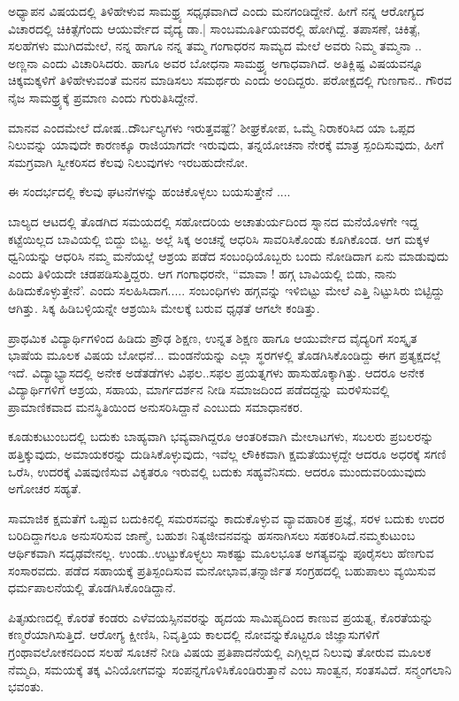 {ಅಧ್ಯಾಪನ ವಿಷಯದಲ್ಲಿ ತಿಳಿಹೇಳುವ ಸಾಮಥ್ರ್ಯ ಸಧೃಢವಾಗಿದೆ ಎಂದು ಮನಗಂಡಿದ್ದೇನೆ.  ಹೀಗೆ ನನ್ನ ಆರೋಗ್ಯದ ವಿಚಾರದಲ್ಲಿ ಚಿಕಿತ್ಸೆಗೆಂದು ಆಯುರ್ವೇದ ವೈದ್ಯ ಡಾ.| ಸಾಂಬಮೂರ್ತಿಯವರಲ್ಲಿ ಹೋಗಿದ್ದೆ. ತಪಾಸಣೆ, ಚಿಕಿತ್ಸೆ, ಸಲಹೆಗಳು ಮುಗಿದಮೇಲೆ, ನನ್ನ ಹಾಗೂ  ನನ್ನ ತಮ್ಮ ಗಂಗಾಧರನ ಸಾಮ್ಯದ ಮೇಲೆ ಅವರು ನಿಮ್ಮ ತಮ್ಮನಾ .. ಅಣ್ಣನಾ ಎಂದು ವಿಚಾರಿಸಿದರು. ಹಾಗೂ ಅವರ ಬೋಧನಾ ಸಾಮಥ್ರ್ಯ ಅಗಾಧವಾಗಿದೆ. ಅತಿಕ್ಲಿಷ್ಟ ವಿಷಯವನ್ನೂ ಚಿಕ್ಕಮಕ್ಕಳಿಗೆ ತಿಳಿಹೇಳುವಂತೆ ಮನನ ಮಾಡಿಸಲು ಸಮರ್ಥರು ಎಂದು ಅಂದಿದ್ದರು. ಪರೋಕ್ಷದಲ್ಲಿ ಗುಣಗಾನ.. ಗೌರವ ನೈಜ ಸಾಮಥ್ರ್ಯಕ್ಕೆ  ಪ್ರಮಾಣ ಎಂದು ಗುರುತಿಸಿದ್ದೇನೆ.

ಮಾನವ ಎಂದಮೇಲೆ ದೋಷ..ದೌರ್ಬಲ್ಯಗಳು ಇರುತ್ತವಷ್ಟೆ?  ಶೀಘ್ರಕೋಪ,  ಒಮ್ಮೆ ನಿರಾಕರಿಸಿದ ಯಾ ಒಪ್ಪದ ನಿಲುವನ್ನು ಯಾವುದೇ ಕಾರಣಕ್ಕೂ ರಾಜಿಯಾಗದೇ ಇರುವುದು,  ತನ್ನಯೋಚನಾ ನೇರಕ್ಕೆ ಮಾತ್ರ ಸ್ಪಂದಿಸುವುದು,  ಹೀಗೆ  ಸಮಗ್ರವಾಗಿ ಸ್ವೀಕರಿ\-ಸದ  ಕೆಲವು ನಿಲುವುಗಳು ಇರಬಹುದೇನೋ.

ಈ ಸಂದರ್ಭದಲ್ಲಿ ಕೆಲವು  ಘಟನೆಗಳನ್ನು  ಹಂಚಿಕೊಳ್ಳಲು ಬಯಸುತ್ತೇನೆ ....
\vskip 2pt

ಬಾಲ್ಯದ ಆಟದಲ್ಲಿ ತೊಡಗಿದ ಸಮಯದಲ್ಲಿ ಸಹೋದರಿಯ ಅಚಾತುರ್ಯದಿಂದ ಸ್ನಾನದ ಮನೆಯೊಳಗೇ ಇದ್ದ ಕಟ್ಟೆಯಿಲ್ಲದ ಬಾವಿಯಲ್ಲಿ ಬಿದ್ದು ಬಿಟ್ಟ. ಅಲ್ಲೆ ಸಿಕ್ಕ ಅಂಚನ್ನೆ ಆಧರಿಸಿ ಸಾವರಿಸಿಕೊಂಡು  ಕೂಗಿಕೊಂಡ. ಆಗ ಮಕ್ಕಳ ಧ್ವನಿಯನ್ನು ಆಧರಿಸಿ ನಮ್ಮ ಮನೆಯಲ್ಲೆ ಆಶ್ರಯ ಪಡೆದ ಸಂಬಂಧಿಯೊಬ್ಬರು ಬಂದು ನೋಡಿದಾಗ ಏನು ಮಾಡುವುದು ಎಂದು ತಿಳಿಯದೇ ಚಡಪಡಿಸುತ್ತಿದ್ದರು. ಆಗ ಗಂಗಾಧರನೇ, “ಮಾವಾ ! ಹಗ್ಗ ಬಾವಿಯಲ್ಲಿ ಬಿಡು, ನಾನು ಹಿಡಿದುಕೊಳ್ಳುತ್ತೇನೆ'. ಎಂದು ಸಲಹಿಸಿದಾಗ..... ಸಂಬಂಧಿಗಳು ಹಗ್ಗವನ್ನು ಇಳಿಬಿಟ್ಟು ಮೇಲೆ ಎತ್ತಿ ನಿಟ್ಟುಸಿರು ಬಿಟ್ಟಿದ್ದು ಆಗಿತ್ತು. ಸಿಕ್ಕ ಹಿಡಿಬಳ್ಳಿಯನ್ನೇ  ಆಶ್ರಯಿಸಿ ಮೇಲಕ್ಕೆ ಬರುವ ಧೃಢತೆ ಆಗಲೇ ಕಂಡಿತ್ತು.
\vskip 2pt

ಪ್ರಾಥಮಿಕ ವಿದ್ಯಾರ್ಥಿಗಳಿಂದ ಹಿಡಿದು ಪ್ರೌಢ ಶಿಕ್ಷಣ, ಉನ್ನತ ಶಿಕ್ಷಣ ಹಾಗೂ ಆಯುರ್ವೇದ ವೈದ್ಯರಿಗೆ ಸಂಸ್ಕೃತ ಭಾಷೆಯ ಮೂಲಕ ವಿಷಯ ಬೋಧನೆ... ಮಂಡನೆ\-ಯನ್ನು ಎಲ್ಲಾ ಸ್ಥರಗಳಲ್ಲಿ ತೊಡಗಿಸಿಕೊಂಡಿದ್ದು ಈಗ ಪ್ರತ್ಯಕ್ಷದಲ್ಲೆ ಇದೆ. ವಿದ್ಯಾಭ್ಯಾಸದಲ್ಲಿ ಅನೇಕ ಅಡೆತಡೆಗಳು ವಿಫಲ..ಸಫಲ ಪ್ರಯತ್ನಗಳು ಹಾಸುಹೊಕ್ಕಾಗಿತ್ತು. ಆದರೂ ಅನೇಕ ವಿದ್ಯಾರ್ಥಿಗಳಿಗೆ  ಆಶ್ರಯ, ಸಹಾಯ,  ಮಾರ್ಗದರ್ಶನ ನೀಡಿ ಸಮಾಜದಿಂದ ಪಡೆದದ್ದನ್ನು ಮರಳಿಸುವಲ್ಲಿ ಪ್ರಾಮಾಣಿಕವಾದ ಮನಸ್ಥಿತಿಯಿಂದ ಅನುಸರಿಸಿದ್ದಾನೆ ಎಂಬುದು  ಸಮಾಧಾನಕರ.
\vskip 2pt

ಕೂಡುಕುಟುಂಬದಲ್ಲಿ ಬದುಕು ಬಾಹ್ಯವಾಗಿ ಭವ್ಯವಾಗಿದ್ದರೂ ಆಂತರಿಕವಾಗಿ ಮೇಲಾಟಗಳು, ಸಬಲರು ಪ್ರಬಲರನ್ನು ಹತ್ತಿಕ್ಕುವುದು, ಅಮಾಯಕರನ್ನು ದುಡಿಸಿ\-ಕೊಳ್ಳುವುದು, ಇವೆಲ್ಲ ಲೌಕಿಕವಾಗಿ ಕ್ಷಮತೆಯುಳ್ಳದ್ದೇ ಆದರೂ ಅಧರಕ್ಕೆ ಸಗಣಿ ಒರೆಸಿ, ಉದರಕ್ಕೆ ವಿಷವುಣಿಸುವ ವಿಕೃತರೂ ಇರುವಲ್ಲಿ ಬದುಕು ಸಹ್ಯವೆನಿಸದು. ಆದರೂ ಮುಂದುವರಿಯುವುದು ಅಗೋಚರ ಸಹ್ಯತೆ. 
\vskip 2pt

ಸಾಮಾಜಿಕ ಕ್ಷಮತೆಗೆ ಒಪ್ಪುವ  ಬದುಕಿನಲ್ಲಿ ಸಮರಸವನ್ನು ಕಾದುಕೊಳ್ಳುವ ವ್ಯಾವ\-ಹಾರಿಕ ಪ್ರಜ್ಞೆ,  ಸರಳ ಬದುಕು ಉದರ ಬರಿದಿದ್ದಾಗಲೂ ಅನುಸರಿಸುವ ಜಾಣ್ಮೆ, ಬಹುಶಃ ನಿತ್ಯಜೀವನವನ್ನು ಹಸನಾಗಿಸಲು ಸಹಕರಿಸಿದೆ.ನಮ್ಮಕುಟುಂಬ ಆರ್ಥಿಕವಾಗಿ ಸದೃಢವೇನಲ್ಲ.  ಉಂಡು..ಉಟ್ಟುಕೊಳ್ಳ್ಳಲು  ಸಾಕಷ್ಟು  ಮೂಲಭೂತ ಅಗತ್ಯವನ್ನು ಪೂರೈಸಲು ಹೆಣಗುವ ಸಂಸಾರವದು. ಪಡೆದ ಸಹಾಯಕ್ಕೆ ಪ್ರತಿಸ್ಪಂದಿಸುವ ಮನೋಭಾವ,\break ತನ್ನಾರ್ಜಿತ ಸಂಗ್ರಹದಲ್ಲಿ ಬಹುಪಾಲು ವ್ಯಯಿಸುವ ಧರ್ಮಪಾಲನೆಯಲ್ಲಿ ತೊಡಗಿಸಿಕೊಂಡಿದ್ದಾನೆ. 

ಪಿತೃಋಣದಲ್ಲಿ ಕೊರತೆ ಕಂಡರು ಎಳೆವಯಸ್ಸಿನವರನ್ನು ಹೃದಯ ಸಾಮಿಪ್ಯದಿಂದ ಕಾಣುವ ಪ್ರಯತ್ನ, ಕೊರತೆಯನ್ನು ಕಣ್ಮರೆಯಾಗಿಸುತ್ತಿದೆ.  ಆರೋಗ್ಯ  ಕ್ಷೀಣಿಸಿ, ನಿವೃತ್ತಿಯ ಕಾಲದಲ್ಲಿ ನೋವನ್ನುಕೊಟ್ಟರೂ ಜಿಜ್ಞಾಸುಗಳಿಗೆ ಗ್ರಂಥಾವಲೋಕನದಿಂದ ಸಲಹೆ ಸೂಚನೆ ನೀಡಿ ವಿಷಯ ಪ್ರತಿಪಾದನೆಯಲ್ಲಿ ಎಗ್ಗಿಲ್ಲದ ನಿಲುವು ತೋರುವ ಮೂಲಕ ನೆಮ್ಮದಿ,  ಸಮಯಕ್ಕೆ ತಕ್ಕ ವಿನಿಯೋಗವನ್ನು ಸಂಪನ್ನಗೊಳಿಸಿಕೊಂಡಿರುತ್ತಾನೆ  ಎಂಬ ಸಾಂತ್ವನ,  ಸಂತಸವಿದೆ.  ಸನ್ಮಂಗಲಾನಿ ಭವಂತು.

\articleend
}
